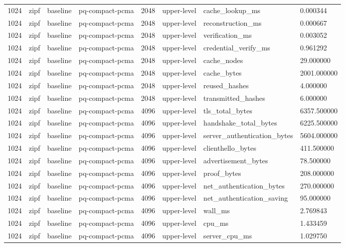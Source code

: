 \begin{tabular}{llllllll}
1024 & zipf & baseline & pq-compact-pcma & 2048 & upper-level & cache\_lookup\_ms & 0.000344 \\
1024 & zipf & baseline & pq-compact-pcma & 2048 & upper-level & reconstruction\_ms & 0.000667 \\
1024 & zipf & baseline & pq-compact-pcma & 2048 & upper-level & verification\_ms & 0.003052 \\
1024 & zipf & baseline & pq-compact-pcma & 2048 & upper-level & credential\_verify\_ms & 0.961292 \\
1024 & zipf & baseline & pq-compact-pcma & 2048 & upper-level & cache\_nodes & 29.000000 \\
1024 & zipf & baseline & pq-compact-pcma & 2048 & upper-level & cache\_bytes & 2001.000000 \\
1024 & zipf & baseline & pq-compact-pcma & 2048 & upper-level & reused\_hashes & 4.000000 \\
1024 & zipf & baseline & pq-compact-pcma & 2048 & upper-level & transmitted\_hashes & 6.000000 \\
1024 & zipf & baseline & pq-compact-pcma & 4096 & upper-level & tls\_total\_bytes & 6357.500000 \\
1024 & zipf & baseline & pq-compact-pcma & 4096 & upper-level & handshake\_total\_bytes & 6225.500000 \\
1024 & zipf & baseline & pq-compact-pcma & 4096 & upper-level & server\_authentication\_bytes & 5604.000000 \\
1024 & zipf & baseline & pq-compact-pcma & 4096 & upper-level & clienthello\_bytes & 411.500000 \\
1024 & zipf & baseline & pq-compact-pcma & 4096 & upper-level & advertisement\_bytes & 78.500000 \\
1024 & zipf & baseline & pq-compact-pcma & 4096 & upper-level & proof\_bytes & 208.000000 \\
1024 & zipf & baseline & pq-compact-pcma & 4096 & upper-level & net\_authentication\_bytes & 270.000000 \\
1024 & zipf & baseline & pq-compact-pcma & 4096 & upper-level & net\_authentication\_saving & 95.000000 \\
1024 & zipf & baseline & pq-compact-pcma & 4096 & upper-level & wall\_ms & 2.769843 \\
1024 & zipf & baseline & pq-compact-pcma & 4096 & upper-level & cpu\_ms & 1.433459 \\
1024 & zipf & baseline & pq-compact-pcma & 4096 & upper-level & server\_cpu\_ms & 1.029750 \\

\end{tabular}
